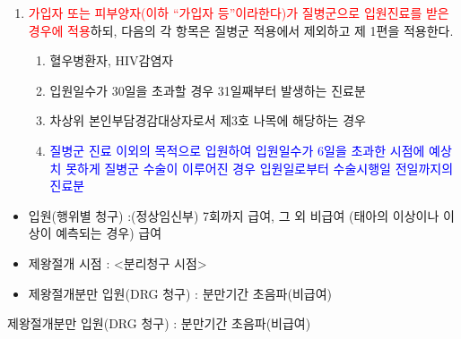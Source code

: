 \begin{myshadowbox}
\begin{enumerate}[2.]\tightlist
\item \textcolor{red}{가입자 또는 피부양자(이하 “가입자 등”이라한다)가 질병군으로 입원진료를 받은 경우에 적용}하되, 다음의 각 항목은 질병군 적용에서 제외하고 제 1편을 적용한다.
	\begin{enumerate}[가.]\tightlist
	\item 혈우병환자, HIV감염자
	\item 입원일수가 30일을 초과할 경우 31일째부터 발생하는 진료분
	\item 차상위 본인부담경감대상자로서 제3호 나목에 해당하는 경우
	\item \textcolor{blue}{질병군 진료 이외의 목적으로 입원하여 입원일수가 6일을 초과한 시점에 예상치 못하게 질병군 수술이 이루어진 경우 입원일로부터 수술시행일 전일까지의 진료분}
	\end{enumerate}
\end{enumerate}
\prezi{\clearpage}
\end{myshadowbox}
\par
\medskip
\prezi{\clearpage}
\Ans
{\begin{itemize}\tightlist
\item 입원(행위별 청구) :(정상임신부) 7회까지 급여, 그 외 비급여 (태아의 이상이나 이상이 예측되는 경우) 급여
\item 제왕절개 시점 : <분리청구 시점>%
\item 제왕절개분만 입원(DRG 청구) : 분만기간 초음파(비급여)
\end{itemize}}
\par
\medskip
\prezi{\clearpage}
\Ans
{제왕절개분만 입원(DRG 청구) : 분만기간 초음파(비급여)}
\prezi{\clearpage}